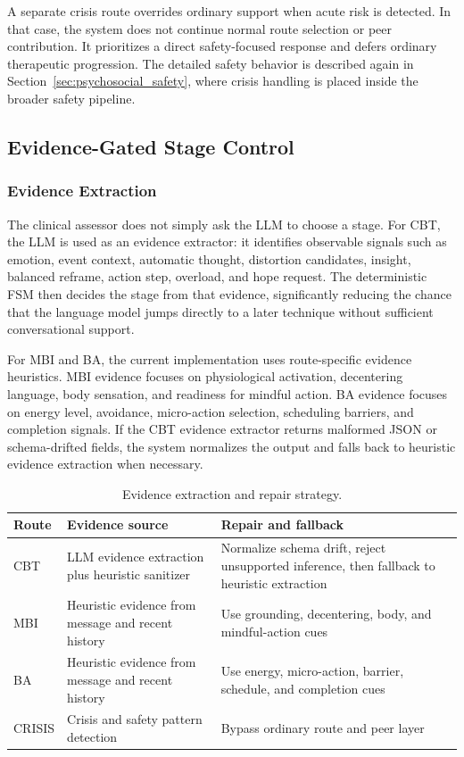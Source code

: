 A separate crisis route overrides ordinary support when acute risk is detected. In that case, the system does not continue normal route selection or peer contribution. It prioritizes a direct safety-focused response and defers ordinary therapeutic progression. The detailed safety behavior is described again in Section~\ref{sec:psychosocial_safety}, where crisis handling is placed inside the broader safety pipeline.

\subsection{Evidence-Gated Stage Control}

\subsubsection{Evidence Extraction}

The clinical assessor does not simply ask the LLM to choose a stage. For CBT, the LLM is used as an evidence extractor: it identifies observable signals such as emotion, event context, automatic thought, distortion candidates, insight, balanced reframe, action step, overload, and hope request. The deterministic FSM then decides the stage from that evidence, significantly reducing the chance that the language model jumps directly to a later technique without sufficient conversational support.

For MBI and BA, the current implementation uses route-specific evidence heuristics. MBI evidence focuses on physiological activation, decentering language, body sensation, and readiness for mindful action. BA evidence focuses on energy level, avoidance, micro-action selection, scheduling barriers, and completion signals. If the CBT evidence extractor returns malformed JSON or schema-drifted fields, the system normalizes the output and falls back to heuristic evidence extraction when necessary.

\begin{table}[tb]
\centering
\caption{Evidence extraction and repair strategy.}
\label{tab:evidence_strategy}
\small
\begin{tabular}{p{}p{}p{}}
\toprule
Route & Evidence source & Repair and fallback \\
\midrule
CBT & LLM evidence extraction plus heuristic sanitizer & Normalize schema drift, reject unsupported inference, then fallback to heuristic extraction \\
MBI & Heuristic evidence from message and recent history & Use grounding, decentering, body, and mindful-action cues \\
BA & Heuristic evidence from message and recent history & Use energy, micro-action, barrier, schedule, and completion cues \\
CRISIS & Crisis and safety pattern detection & Bypass ordinary route and peer layer \\
\bottomrule
\end{tabular}
\end{table}

